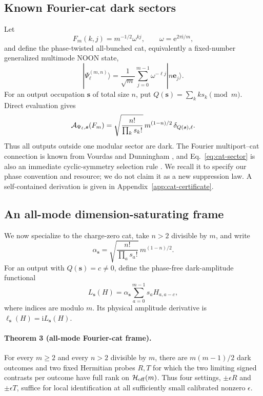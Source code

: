 \documentclass[aps,pra,reprint,amsmath,amssymb,superscriptaddress,longbibliography]{revtex4-2}
\newcommand{\ii}{\mathrm{i}}
\newcommand{\ee}{\mathrm{e}}
\newcommand{\be}{\bm e}
\begin{document}
\subsection{Known Fourier-cat dark sectors}

Let
\begin{equation}
 F_m(k,j)=m^{-1/2}\omega^{kj},\qquad
 \omega=\ee^{2\pi\ii/m},
\end{equation}
and define the phase-twisted all-bunched cat, equivalently a fixed-number
generalized multimode NOON state,
\begin{equation}
 |\Psi_\ell^{(m,n)}\rangle
 =\frac1{\sqrt m}\sum_{j=0}^{m-1}
 \omega^{-\ell j}|n\be_j\rangle .
\label{eq:general-cat}
\end{equation}
For an output occupation $\bm s$ of total size $n$, put
$Q(\bm s)=\sum_kks_k\pmod m$.  Direct evaluation gives
\begin{equation}
 {\cal A}_{\Psi_\ell,\bm s}(F_m)
 =
 \sqrt{\frac{n!}{\prod_ks_k!}}\,
 m^{(1-n)/2}\,
 \delta_{Q(\bm s),\ell}.
\label{eq:cat-sector}
\end{equation}
Thus all outputs outside one modular sector are dark.  The Fourier
multiport--cat connection is known from
Vourdas and Dunningham \cite{VourdasDunningham2005}, and
Eq.~\eqref{eq:cat-sector} is also an immediate cyclic-symmetry selection
rule \cite{Dittel2018PRA}.  We recall it to specify our phase convention and
resource; we do not claim it as a new suppression law.  A self-contained
derivation is given in Appendix~\ref{app:cat-certificate}.

\subsection{An all-mode dimension-saturating frame}

We now specialize to the charge-zero cat, take $n>2$ divisible by $m$, and
write
\begin{equation}
 \alpha_{\bm s}=
 \sqrt{\frac{n!}{\prod_as_a!}}\,m^{(1-n)/2}.
\end{equation}
For an output with $Q(\bm s)=c\neq0$, define the phase-free dark-amplitude
functional
\begin{equation}
 L_{\bm s}(H)=\alpha_{\bm s}\sum_{a=0}^{m-1}s_aH_{a,a-c},
\label{eq:general-dark-functional}
\end{equation}
where indices are modulo $m$.  Its physical amplitude derivative is
$\ell_{\bm s}(H)=\ii L_{\bm s}(H)$.

\paragraph*{Theorem 3 (all-mode Fourier-cat frame).}
For every $m\geq2$ and every $n>2$ divisible by $m$, there are
$m(m-1)/2$ dark outcomes and two fixed Hermitian probes $R,T$ for which
the two limiting signed contrasts per outcome have full rank on
${\cal H}_{\rm off}(m)$.  Thus four settings,
$\pm\epsilon R$ and $\pm\epsilon T$, suffice for local identification at
all sufficiently small calibrated nonzero $\epsilon$.
\end{document}
